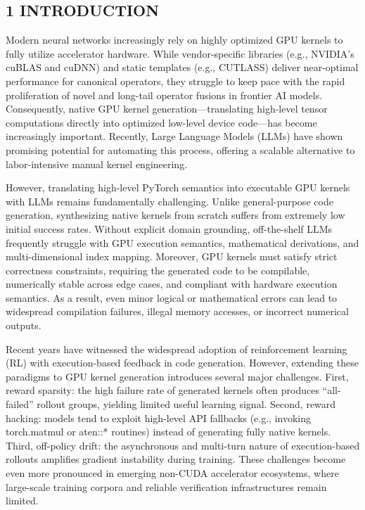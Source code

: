 \documentclass[
  10
]{article}
\begin{document}
\subsection{1 INTRODUCTION}\label{introduction}

Modern neural networks increasingly rely on highly optimized GPU kernels
to fully utilize accelerator hardware. While vendor-specific libraries
(e.g., NVIDIA's cuBLAS and cuDNN) and static templates (e.g., CUTLASS)
deliver near-optimal performance for canonical operators, they struggle
to keep pace with the rapid proliferation of novel and long-tail
operator fusions in frontier AI models. Consequently, native GPU kernel
generation---translating high-level tensor computations directly into
optimized low-level device code---has become increasingly important.
Recently, Large Language Models (LLMs) have shown promising potential
for automating this process, offering a scalable alternative to
labor-intensive manual kernel engineering.

However, translating high-level PyTorch semantics into executable GPU
kernels with LLMs remains fundamentally challenging. Unlike
general-purpose code generation, synthesizing native kernels from
scratch suffers from extremely low initial success rates. Without
explicit domain grounding, off-the-shelf LLMs frequently struggle with
GPU execution semantics, mathematical derivations, and multi-dimensional
index mapping. Moreover, GPU kernels must satisfy strict correctness
constraints, requiring the generated code to be compilable, numerically
stable across edge cases, and compliant with hardware execution
semantics. As a result, even minor logical or mathematical errors can
lead to widespread compilation failures, illegal memory accesses, or
incorrect numerical outputs.

Recent years have witnessed the widespread adoption of reinforcement
learning (RL) with execution-based feedback in code generation. However,
extending these paradigms to GPU kernel generation introduces several
major challenges. First, reward sparsity: the high failure rate of
generated kernels often produces ``all-failed'' rollout groups, yielding
limited useful learning signal. Second, reward hacking: models tend to
exploit high-level API fallbacks (e.g., invoking torch.matmul or aten::*
routines) instead of generating fully native kernels. Third, off-policy
drift: the asynchronous and multi-turn nature of execution-based
rollouts amplifies gradient instability during training. These
challenges become even more pronounced in emerging non-CUDA accelerator
ecosystems, where large-scale training corpora and reliable verification
infrastructures remain limited.
\end{document}
